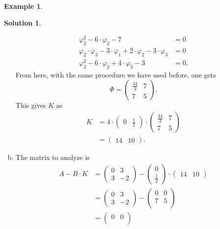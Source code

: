 \documentclass[a4paper,12 pt]{article}
\numberwithin{equation}{section}
\theoremstyle{definition}
\newtheorem{bsp}{Example}
\theoremstyle{remark}
\theoremstyle{definition}
\newtheorem*{lsg}{Solution}
\theoremstyle{definition}
\theoremstyle{definition}
\theoremstyle{remark}
\begin{document}
\begin{bsp}
\begin{lsg}
\begin{enumerate}[(a)]
\begin{equation*}
\begin{split}
\varphi_2^2-6\cdot \varphi_2 -7 &=0\\
\varphi_2\cdot \varphi_3-3\cdot \varphi_1 +2\cdot \varphi_2 -3\cdot \varphi_3 &=0\\
\varphi_3^2-6\cdot \varphi_2+4\cdot \varphi_3-3&=0.
\end{split}
\end{equation*}
From here, with the same procedure we have used before, one gets
\begin{equation*}
\Phi=\begin{pmatrix}
\frac{34}{3}&7\\
7&5
\end{pmatrix}.
\end{equation*}
This gives $K$ as
\begin{equation*}
\begin{split}
K&=4\cdot \begin{pmatrix} 0&\frac{1}{2} \end{pmatrix} \cdot \begin{pmatrix}
\frac{34}{3}&7\\
7&5
\end{pmatrix}\\
&=\begin{pmatrix}
14&10 
\end{pmatrix}.
\end{split}
\end{equation*}
\item The matrix to analyze is
\begin{equation*}
\begin{split}
A-B\cdot K&=\begin{pmatrix} 0&3 \\ 3&-2 
\end{pmatrix}-\begin{pmatrix}
0\\ \frac{1}{2}
\end{pmatrix}\cdot \begin{pmatrix}
14&10 
\end{pmatrix}\\
&=\begin{pmatrix} 0&3 \\ 3&-2 
\end{pmatrix}- \begin{pmatrix}
 0&0\\
 7&5\\
 \end{pmatrix}\\
&=\begin{pmatrix} 0&0\\

\end{pmatrix}
\end{split}
\end{equation*}
\end{enumerate}
\end{lsg}
\end{bsp}
\end{document}
